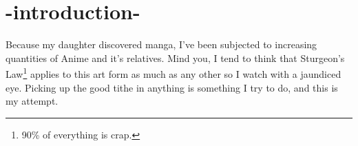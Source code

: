 \chapter{-introduction-}
Because my daughter discovered manga, I've been subjected to
increasing quantities of Anime and it's relatives. Mind you, I
tend to think that Sturgeon's Law\footnote{90\% of everything is
crap.} applies to this art form as much as any other so I watch
with a jaundiced eye. Picking up the good tithe in anything
is something I try to do, and this is my attempt.
